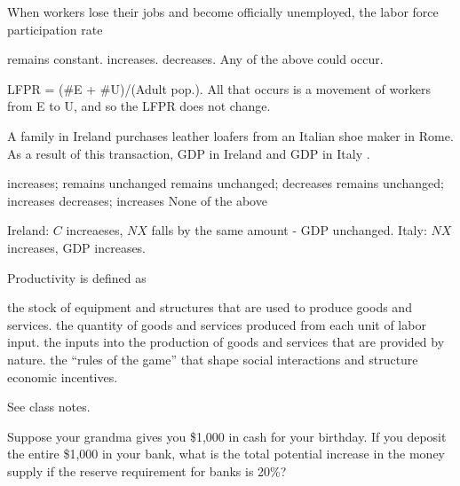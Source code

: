 \documentclass[addpoints,11pt]{exam}
\theoremstyle{definition}
\newcommand{\blank}[0]{\underline{\hspace{3cm}}}
\begin{document}
\begin{questions}
	
\question When workers lose their jobs and become officially unemployed, the labor force participation rate

\begin{choices}
	\CorrectChoice remains constant.
	\choice increases. 
	\choice decreases.
	\choice Any of the above could occur.
\end{choices}

\begin{solution} 
	LFPR = (\#E + \#U)/(Adult pop.). All that occurs is a movement of workers from E to U, and so the LFPR does not change.
\end{solution}
	
\question A family in Ireland purchases leather loafers from an Italian shoe maker in Rome. As a result of this transaction, GDP in Ireland \blank and GDP in Italy \blank. 
		
		\begin{choices}
			\choice increases; remains unchanged
			\choice remains unchanged; decreases
			\CorrectChoice remains unchanged; increases
			\choice decreases; increases
			\choice None of the above
		\end{choices}
		
\begin{solution} 
	Ireland: $C$ increaeses, $NX$ falls by the same amount - GDP unchanged. Italy: $NX$ increases, GDP increases.
\end{solution}

\newpage

	\question Productivity is defined as 
	
	\begin{choices}
		\choice the stock of equipment and structures that are used to produce goods and services.
		\CorrectChoice the quantity of goods and services produced from each unit of labor input.
		\choice the inputs into the production of goods and services that are provided by nature.
		\choice the ``rules of the game'' that shape social interactions and structure economic incentives.
	\end{choices}
	
	\begin{solution} 
		See class notes.
	\end{solution}
	
	\question Suppose your grandma gives you \$1,000 in cash for your birthday. If you deposit the entire \$1,000 in your bank, what is the total potential increase in the money supply if the reserve requirement for banks is 20\%?
	

\end{questions}
\end{document}
